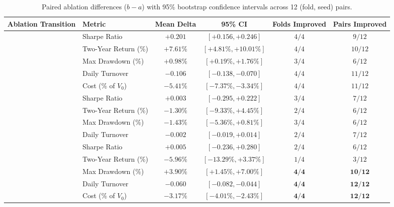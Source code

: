 \begin{table}[htbp]
\centering
\small
\setlength{\tabcolsep}{4.5pt}
\caption{Paired ablation differences ($b - a$) with 95\% bootstrap confidence intervals across 12 (fold, seed) pairs.}
\label{tab:ablation_deltas}
\begin{tabular}{@{}llcccc@{}}
\toprule
\textbf{Ablation Transition} & \textbf{Metric} & \textbf{Mean Delta} & \textbf{95\% CI} & \textbf{Folds Improved} & \textbf{Pairs Improved} \\
\midrule
{} 
& Sharpe Ratio & $+0.201$ & $[+0.156, +0.246]$ & $4 / 4$ & $9 / 12$ \\
& Two-Year Return (\%) & $+7.61\%$ & $[+4.81\%, +10.01\%]$ & $4 / 4$ & $10 / 12$ \\
& Max Drawdown (\%) & $+0.98\%$ & $[+0.19\%, +1.76\%]$ & $3 / 4$ & $6 / 12$ \\
& Daily Turnover & $-0.106$ & $[-0.138, -0.070]$ & $4 / 4$ & $11 / 12$ \\
& Cost (\% of $V_0$) & $-5.41\%$ & $[-7.37\%, -3.34\%]$ & $4 / 4$ & $11 / 12$ \\
\midrule
{} 
& Sharpe Ratio & $+0.003$ & $[-0.295, +0.222]$ & $3 / 4$ & $7 / 12$ \\
& Two-Year Return (\%) & $-1.30\%$ & $[-9.33\%, +4.45\%]$ & $2 / 4$ & $6 / 12$ \\
& Max Drawdown (\%) & $-1.43\%$ & $[-5.36\%, +0.81\%]$ & $3 / 4$ & $6 / 12$ \\
& Daily Turnover & $-0.002$ & $[-0.019, +0.014]$ & $2 / 4$ & $7 / 12$ \\
\midrule
{} 
& Sharpe Ratio & $+0.005$ & $[-0.236, +0.280]$ & $2 / 4$ & $6 / 12$ \\
& Two-Year Return (\%) & $-5.96\%$ & $[-13.29\%, +3.37\%]$ & $1 / 4$ & $3 / 12$ \\
& Max Drawdown (\%) & $\mathbf{+3.90\%}$ & $[+1.45\%, +7.00\%]$ & $\mathbf{4 / 4}$ & $\mathbf{10 / 12}$ \\
& Daily Turnover & $\mathbf{-0.060}$ & $[-0.082, -0.044]$ & $\mathbf{4 / 4}$ & $\mathbf{12 / 12}$ \\
& Cost (\% of $V_0$) & $\mathbf{-3.17\%}$ & $[-4.01\%, -2.43\%]$ & $\mathbf{4 / 4}$ & $\mathbf{12 / 12}$ \\

\end{tabular}
\end{table}
